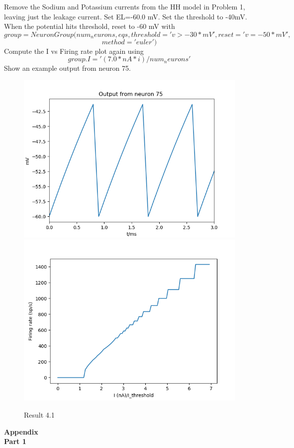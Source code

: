 \documentclass[12pt]{article}
\begin{document}
Remove	the	Sodium	and	Potassium	currents	from	the	HH	model in	Problem	1,	
leaving	just	the	leakage current.	Set	EL=-60.0	mV. Set	the	threshold	to	
-40mV.	When	the	potential	hits	threshold,	reset	to	-60	mV	with
$$group	=	NeuronGroup(num_neurons,	eqs,	threshold='v	>	-30*mV',reset='v	=	-
50*mV',$$
$$method='euler')	$$
Compute	the	I	vs	Firing	rate	plot	again	using
$$group.I	=	'(7.0*nA	*	i)	/	num_neurons'$$
Show	an	example	output	from	neuron	75.
 \begin{figure}[H]
  \centering
  \includegraphics[width=.5\textwidth]{h4_p1_out.png} %
  \label{img} %
  \includegraphics[width=.5\textwidth]{h4_p1_fr.png} %
  \label{img} %
  \caption{Result 4.1}
\end{figure}
\newpage
\large \textbf{Appendix}
\\

\normalsize\textbf{Part 1}
\\
\end{document}

